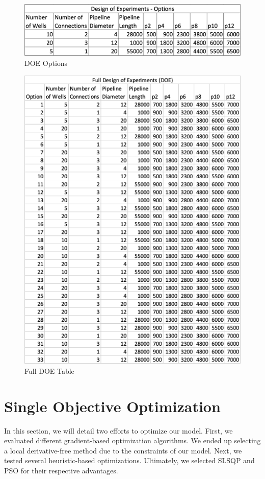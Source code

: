 \documentclass[balance,upint,subscriptcorrection,varvw,mathalfa=cal=boondoxo,spanish,french,vietnamese,russian,greek,pdf-a,colorlinks]{asmeconf}
\begin{document}


\begin{figure}[btp]
\centering\includegraphics[width=0.7\linewidth]{images/DOE.png}
\caption{DOE Options}\label{doe_options:1}
\end{figure}
 



\begin{figure}
\centering\includegraphics[width=0.7\linewidth]{images/full_DOE.png}
\caption{Full DOE Table}\label{full_doe:1}
\end{figure}
 

\section{Single Objective Optimization}
In this section, we will detail two efforts to optimize our model. First, we evaluated different gradient-based optimization algorithms. We ended up selecting a local derivative-free method due to the constraints of our model. Next, we tested several heuristic-based optimizations. Ultimately, we selected SLSQP and PSO for their respective advantages.
\end{document}
